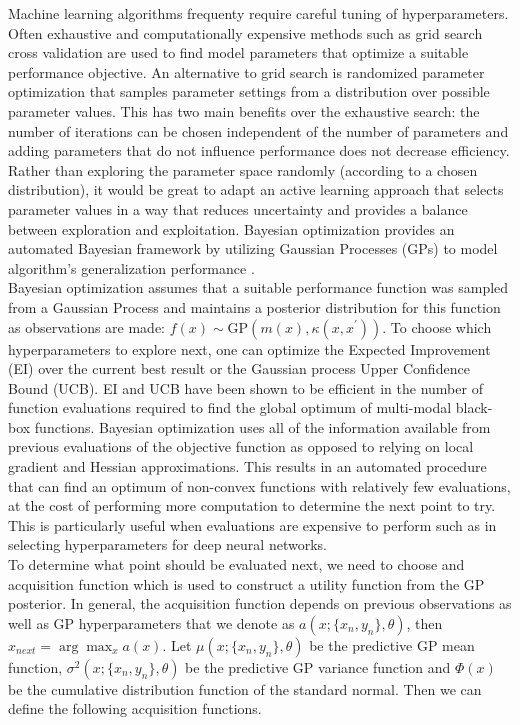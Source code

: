Machine learning algorithms frequenty require careful tuning of hyperparameters. Often exhaustive and computationally expensive methods such as grid search cross validation are used to find model parameters that optimize a suitable performance objective. An alternative to grid search is randomized parameter optimization that samples parameter settings from a distribution over possible parameter values. This has two main benefits over the exhaustive search: the number of iterations can be chosen independent of the number of parameters and adding parameters that do not influence performance does not decrease efficiency. Rather than exploring the parameter space randomly (according to a chosen distribution), it would be great to adapt an active learning approach that selects parameter values in a way that reduces uncertainty and provides a balance between exploration and exploitation. Bayesian optimization provides an automated Bayesian framework by utilizing Gaussian Processes (GPs) to model algorithm's generalization performance \cite{snoek2012}.\\

Bayesian optimization assumes that a suitable performance function was sampled from a Gaussian Process and maintains a posterior distribution for this function as observations are made: $f(x)\sim \mathrm{GP}(m(x),\kappa(x,x^{\prime}))$. To choose which hyperparameters to explore next, one can optimize the Expected Improvement (EI) over the current best result or the Gaussian process Upper Confidence Bound (UCB). EI and UCB have been shown to be efficient in the number of function evaluations required to find the global optimum of multi-modal black-box functions. Bayesian optimization uses all of the information available from previous evaluations of the objective function as opposed to relying on local gradient and Hessian approximations. This results in an automated procedure that can find an optimum of non-convex functions with relatively few evaluations, at the cost of performing more computation to determine the next point to try. This is particularly useful when evaluations are expensive to perform such as in selecting hyperparameters for deep neural networks.\\

To determine what point should be evaluated next, we need to choose and acquisition function which is used to construct a utility function from the GP posterior. In general, the acquisition function depends on previous observations as well as GP hyperparameters that we denote as $a(x;\{x_n,y_n\},\theta)$, then $x_{next} = \arg \max_x a(x)$. Let $\mu(x;\{x_n,y_n\},\theta)$ be the predictive GP mean function, $\sigma^{2}(x;\{x_n,y_n\},\theta)$ be the predictive GP variance function and $\Phi(x)$ be the cumulative distribution function of the standard normal. Then we can define the following acquisition functions.\\

